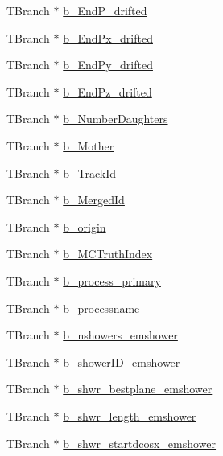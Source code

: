 \begin{DoxyCompactItemize}
\item 
T\-Branch $\ast$ \hyperlink{classanatree_a6f8f8f6ccfc3583fb9400ff012206107}{b\-\_\-\-End\-P\-\_\-drifted}
\item 
T\-Branch $\ast$ \hyperlink{classanatree_a7a2b895dc4fdc7d9d02928653278b7c5}{b\-\_\-\-End\-Px\-\_\-drifted}
\item 
T\-Branch $\ast$ \hyperlink{classanatree_a0d6c1738c50875ffb6dbab74de848e08}{b\-\_\-\-End\-Py\-\_\-drifted}
\item 
T\-Branch $\ast$ \hyperlink{classanatree_ace6097b3b1d7c95f50cf75ecd869d326}{b\-\_\-\-End\-Pz\-\_\-drifted}
\item 
T\-Branch $\ast$ \hyperlink{classanatree_a7088ff36700d36920cdef646aa39591a}{b\-\_\-\-Number\-Daughters}
\item 
T\-Branch $\ast$ \hyperlink{classanatree_a110733896bdb4cc1c0c084a3835ebff2}{b\-\_\-\-Mother}
\item 
T\-Branch $\ast$ \hyperlink{classanatree_a69cf89be813e633606052eea1503c4ad}{b\-\_\-\-Track\-Id}
\item 
T\-Branch $\ast$ \hyperlink{classanatree_afd227d379f802626ec86d884308c1e3c}{b\-\_\-\-Merged\-Id}
\item 
T\-Branch $\ast$ \hyperlink{classanatree_a12a0cb5a0e9e289e59d20ca5a90498a5}{b\-\_\-origin}
\item 
T\-Branch $\ast$ \hyperlink{classanatree_a9c9fb056f417e46436a767a47a2b0ac0}{b\-\_\-\-M\-C\-Truth\-Index}
\item 
T\-Branch $\ast$ \hyperlink{classanatree_af3f4d6108b3cb450a317a5a130303729}{b\-\_\-process\-\_\-primary}
\item 
T\-Branch $\ast$ \hyperlink{classanatree_a0f7e2b957aa1d011e051f92297eee41f}{b\-\_\-processname}
\item 
T\-Branch $\ast$ \hyperlink{classanatree_a3ea35b914b9a6a2ccdfdab81dcf12c67}{b\-\_\-nshowers\-\_\-emshower}
\item 
T\-Branch $\ast$ \hyperlink{classanatree_a77b3777c94e70442c12270e7045e76e4}{b\-\_\-shower\-I\-D\-\_\-emshower}
\item 
T\-Branch $\ast$ \hyperlink{classanatree_af213943a244b6f731b213cd36abbb195}{b\-\_\-shwr\-\_\-bestplane\-\_\-emshower}
\item 
T\-Branch $\ast$ \hyperlink{classanatree_a93216be71fcdf8493a2ae993480ec3ab}{b\-\_\-shwr\-\_\-length\-\_\-emshower}
\item 
T\-Branch $\ast$ \hyperlink{classanatree_add9e4238d8e87385ce64f1e198245c53}{b\-\_\-shwr\-\_\-startdcosx\-\_\-emshower}
\item 

\end{DoxyCompactItemize}
